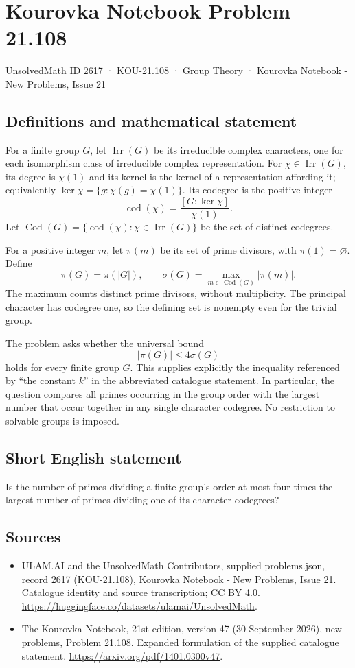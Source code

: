 \documentclass[11pt,a4paper]{article}
\begin{document}
\section*{Kourovka Notebook Problem 21.108}\label{2617}
{\small UnsolvedMath ID 2617 · KOU-21.108 · Group Theory · Kourovka Notebook - New Problems, Issue 21}
\subsection{Definitions and mathematical statement}
For a finite group $G$, let $\operatorname{Irr}(G)$ be its irreducible complex characters, one for each isomorphism class of irreducible complex representation. For $\chi\in\operatorname{Irr}(G)$, its degree is $\chi(1)$ and its kernel is the kernel of a representation affording it; equivalently $\ker\chi=\{g:\chi(g)=\chi(1)\}$. Its codegree is the positive integer
\[
 \operatorname{cod}(\chi)=\frac{[G:\ker\chi]}{\chi(1)}.
\]
Let $\operatorname{Cod}(G)=\{\operatorname{cod}(\chi):\chi\in\operatorname{Irr}(G)\}$ be the set of distinct codegrees.

For a positive integer $m$, let $\pi(m)$ be its set of prime divisors, with $\pi(1)=\varnothing$. Define
\[
 \pi(G)=\pi(|G|),\qquad
 \sigma(G)=\max_{m\in\operatorname{Cod}(G)}|\pi(m)|.
\]
The maximum counts distinct prime divisors, without multiplicity. The principal character has codegree one, so the defining set is nonempty even for the trivial group.

The problem asks whether the universal bound
\[
 |\pi(G)|\le4\sigma(G)
\]
holds for every finite group $G$. This supplies explicitly the inequality referenced by ``the constant $k$'' in the abbreviated catalogue statement. In particular, the question compares all primes occurring in the group order with the largest number that occur together in any single character codegree. No restriction to solvable groups is imposed.
\subsection{Short English statement}
Is the number of primes dividing a finite group’s order at most four times the largest number of primes dividing one of its character codegrees?
\subsection{Sources}
\begin{itemize}
\item[S1] ULAM.AI and the UnsolvedMath Contributors, supplied problems.json, record 2617 (KOU-21.108), Kourovka Notebook - New Problems, Issue 21. Catalogue identity and source transcription; CC BY 4.0.
\url{https://huggingface.co/datasets/ulamai/UnsolvedMath}.
\item[S2] The Kourovka Notebook, 21st edition, version 47 (30 September 2026), new problems, Problem 21.108. Expanded formulation of the supplied catalogue statement.
\url{https://arxiv.org/pdf/1401.0300v47}.
\end{itemize}
\end{document}
